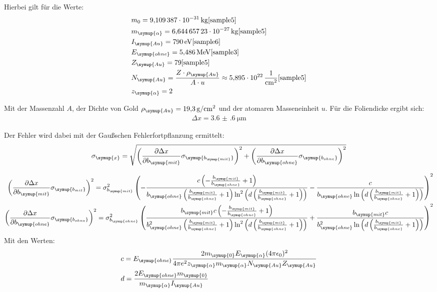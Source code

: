 Hierbei gilt für die Werte:
\begin{align*}
  &m_0 = \SI{9.109387e-31}{\kilo\gram}   \text{\cite{sample5}}\\
  &m_{\symup{\alpha}} = \SI{6.64465723e-27}{\kilo\gram} \text{\cite{sample5}}\\
  &I_{\symup{Au}} = \SI{790}{\eV} \text{\cite{sample6}}\\
  &E_{\symup{ohne}} = \SI{5.486}{\mega\eV}   \text{\cite{sample3}} \\
  &Z_{\symup{Au}} = 79 \text{\cite{sample5}}\\
  &N_{\symup{Au}} = \frac{Z \cdot \rho_{\symup{Au}}}{A \cdot u} \approx \SI{5.895e22}{\per\centi\meter\squared} \text{\cite{sample5}}\\
  &z_{\symup{\alpha}} = 2 \\
\end{align*}


Mit der Massenzahl $A$, der Dichte von Gold $\rho_{\symup{Au}}= \SI{19.3}{\gram\per\centi\meter\squared}$ \cite{sample7} und der atomaren Masseneinheit $u$.
Für die Foliendicke ergibt sich:
\begin{align*}
  \Delta x = \SI{3.6(6)}{\micro\meter}
\end{align*}

Der Fehler wird dabei mit der Gaußschen Fehlerfortpflanzung ermittelt:
\begin{align*}
  \sigma_{\symup{x}} = \sqrt{\left(\frac{\partial \Delta x}{\partial b_{\symup{mit}}}\sigma_{\symup{b_{\symup{mit}}}}\right)^2 + \left(\frac{\partial \Delta x}{\partial b_{\symup{ohne}}}\sigma_{\symup{b_{ohne}}}\right)^2}
\end{align*}

\begin{align*}
  \left(\frac{\partial \Delta x}{\partial b_{\symup{mit}}}\sigma_{\symup{b_{mit}}}\right)^2 = \sigma_{b_{\symup{mit}}}^{2} \left(- \frac{c \left(- \frac{b_{\symup{mit}}}{b_{\symup{ohne}}} + 1\right)}{b_{\symup{ohne}} \left(\frac{b_{\symup{mit}}}{b_{\symup{ohne}}} + 1\right) \ln^{2}{\left (d \left(\frac{b_{\symup{mit}}}{b_{\symup{ohne}}} + 1\right) \right )}} - \frac{c}{b_{\symup{ohne}} \ln{\left (d \left(\frac{b_{\symup{mit}}}{b_{\symup{ohne}}} + 1\right) \right )}}\right)^{2} \\
  \left(\frac{\partial \Delta x}{\partial b_{\symup{ohne}}}\sigma_{\symup{b_{ohne}}}\right)^2 = \sigma_{b_{\symup{ohne}}}^{2} \left(\frac{b_{\symup{mit}} c \left(- \frac{b_{\symup{mit}}}{b_{\symup{ohne}}} + 1\right)}{b_{\symup{ohne}}^{2} \left(\frac{b_{\symup{mit}}}{b_{\symup{ohne}}} + 1\right) \ln^{2}{\left (d \left(\frac{b_{\symup{mit}}}{b_{\symup{ohne}}} + 1\right) \right )}} + \frac{b_{\symup{mit}} c}{b_{\symup{ohne}}^{2} \ln{\left (d \left(\frac{b_{\symup{mit}}}{b_{\symup{ohne}}} + 1\right) \right )}}\right)^{2}
\end{align*}
Mit den Werten:
\begin{align*}
  &c =  E_{\symup{ohne}} \frac{2 m_{\symup{0}} E_{\symup{\alpha}} (4 \pi \epsilon_0)^2}{4 \pi e^2 z_{\symup{\alpha}}  m_{\symup{\alpha}} N_{\symup{Au}} Z_{\symup{Au}}} \\
  &d = \frac{2 E_{\symup{ohne}} m_{\symup{0}}}{m_{\symup{\alpha}} I_{\symup{Au}}}
\end{align*}


